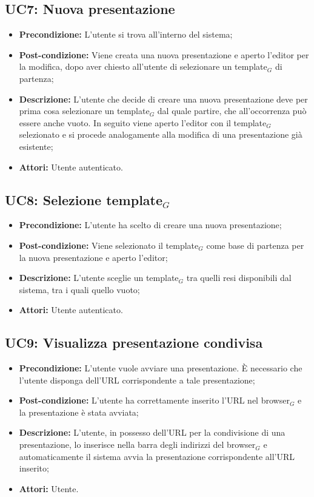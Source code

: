 \subsection{ UC7: Nuova presentazione}

\begin{itemize}
	\item \textbf{Precondizione:} L’utente si trova all’interno del sistema;
	\item \textbf{Post-condizione:} Viene creata una nuova presentazione e aperto l’editor per la modifica, dopo aver chiesto all’utente di selezionare un template$_G$ di partenza;
	\item \textbf{Descrizione:} L’utente che decide di creare una nuova presentazione deve per prima cosa selezionare un template$_G$ dal quale partire, che all’occorrenza può essere anche vuoto. In seguito viene aperto l’editor con il template$_G$ selezionato e si procede analogamente alla modifica di una presentazione già esistente;
	\item \textbf{Attori:} Utente autenticato.
\end{itemize}
\subsection{ UC8: Selezione template$_G$}

\begin{itemize}
	\item \textbf{Precondizione:} L’utente ha scelto di creare una nuova presentazione;
	\item \textbf{Post-condizione:} Viene selezionato il template$_G$ come base di partenza per la nuova presentazione e aperto l’editor;
	\item \textbf{Descrizione:} L’utente sceglie un template$_G$ tra quelli resi disponibili dal sistema, tra i quali quello vuoto;
	\item \textbf{Attori:} Utente autenticato.
\end{itemize}
\subsection{ UC9: Visualizza presentazione condivisa}

\begin{itemize}
	\item \textbf{Precondizione:} L’utente vuole avviare una presentazione. È necessario che l’utente disponga dell'URL corrispondente a tale presentazione;
	\item \textbf{Post-condizione:} L’utente ha correttamente inserito l'URL nel browser$_G$ e la presentazione è stata avviata;
	\item \textbf{Descrizione:} L’utente, in possesso dell'URL per la condivisione di una presentazione, lo inserisce nella barra degli indirizzi del browser$_G$ e automaticamente il sistema avvia la presentazione corrispondente all'URL inserito;
	\item \textbf{Attori:} Utente.
\end{itemize}